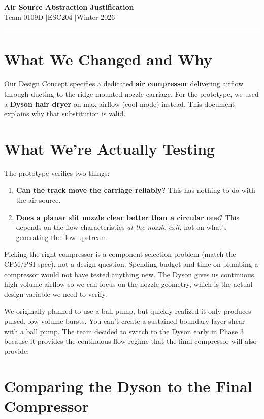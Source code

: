 \documentclass[12pt, letterpaper]{article}
\begin{document}
\begin{center}
{\Large\textbf{Air Source Abstraction Justification}}\\[2pt]
{\normalsize Team 0109D \quad$\vert$\quad ESC204 \quad$\vert$\quad Winter 2026}
\end{center}
\noindent\rule{\textwidth}{0.6pt}\vspace{6pt}

\section{What We Changed and Why}

Our Design Concept specifies a dedicated \textbf{air compressor} delivering airflow through ducting to the ridge-mounted nozzle carriage. For the prototype, we used a \textbf{Dyson hair dryer} on max airflow (cool mode) instead. This document explains why that substitution is valid.

\section{What We're Actually Testing}

The prototype verifies two things:

\begin{enumerate}
    \item \textbf{Can the track move the carriage reliably?} This has nothing to do with the air source.
    \item \textbf{Does a planar slit nozzle clear better than a circular one?} This depends on the flow characteristics \textit{at the nozzle exit}, not on what's generating the flow upstream.
\end{enumerate}

Picking the right compressor is a component selection problem (match the CFM/PSI spec), not a design question. Spending budget and time on plumbing a compressor would not have tested anything new. The Dyson gives us continuous, high-volume airflow so we can focus on the nozzle geometry, which is the actual design variable we need to verify.

We originally planned to use a ball pump, but quickly realized it only produces pulsed, low-volume bursts. You can't create a sustained boundary-layer shear with a ball pump. The team decided to switch to the Dyson early in Phase 3 because it provides the continuous flow regime that the final compressor will also provide.

\section{Comparing the Dyson to the Final Compressor}
\end{document}
